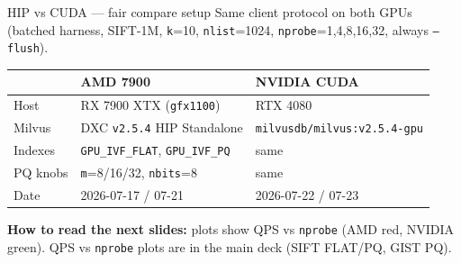 \documentclass[aspectratio=169,11pt]{beamer}
\begin{document}
\begin{frame}{HIP vs CUDA --- fair compare setup}
  \footnotesize
  Same client protocol on both GPUs (batched harness, SIFT-1M, \texttt{k}=10,
  \texttt{nlist}=1024, \texttt{nprobe}=1,4,8,16,32, always \texttt{--flush}).\\[0.35em]

  \begin{center}
  \begin{tabular}{@{}lll@{}}
    \toprule
    & \textbf{AMD 7900} & \textbf{NVIDIA CUDA} \\
    \midrule
    Host & RX 7900 XTX (\texttt{gfx1100}) & RTX 4080 \\
    Milvus & DXC \texttt{v2.5.4} HIP Standalone
      & \texttt{milvusdb/milvus:v2.5.4-gpu} \\
    Indexes & \texttt{GPU\_IVF\_FLAT}, \texttt{GPU\_IVF\_PQ}
      & same \\
    PQ knobs & \texttt{m}=8/16/32, \texttt{nbits}=8
      & same \\
    Date & 2026-07-17 / 07-21 & 2026-07-22 / 07-23 \\
    \bottomrule
  \end{tabular}
  \end{center}

  \vspace{0.5em}
  \textbf{How to read the next slides:}
  plots show QPS vs \texttt{nprobe} (AMD red, NVIDIA green).
  QPS vs \texttt{nprobe} plots are in the main deck (SIFT FLAT/PQ, GIST PQ).
\end{frame}
\end{document}
